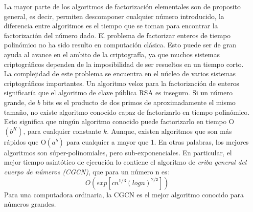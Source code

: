 La mayor parte de los algoritmos de factorización elementales son de proposito general, es decir, permiten descomponer cualquier
número introducido, la diferencia entre algoritmos es el tiempo que se toman para encontrar la factorización del número dado. El problema de 
factorizar enteros de tiempo polinómico no ha sido resulto en computación clásica. Esto puede ser de gran ayuda al avance en el ambito de la 
criptografía, ya que muchos sistemas criptográficos dependen de la imposibilidad de ser resueltos en un tiempo corto. La complejidad de este problema se encuentra en el núcleo de varios sistemas criptográficos importantes. Un algoritmo veloz para la factorización
de enteros significaría que el algoritmo de clave pública RSA es inseguro. Si un número grande, de $b$ bits es el producto de dos primos
de aproximadamente el mismo tamaño, no existe algoritmo conocido capaz de factorizarlo en tiempo polinómico. Esto significa que ningún algoritmo
conocido puede factorizarlo en tiempo O$(b^K)$, para cualquier constante $k$. Aunque, existen algoritmos que son más rápidos que O$(a^b)$ para cualquier a 
mayor que 1. En otras palabras, los mejores algoritmos son súper-polinomiales, pero sub-exponenciales. En particular, el mejor tiempo
asintótico de ejecución lo contiene el algoritmo de \textit{criba general del cuerpo de números\cite{Agrios2003,Telecomunicacion2003} (CGCN)}, que para un número n es:
\begin{equation}
    O\left(exp\left[c n^{1/3} \left(log n\right)^{2/3} \right] \right)
    \label{eq:O(clasico)}
\end{equation}
Para una computadora ordinaria, la CGCN es el mejor algoritmo conocido para números grandes.\\
